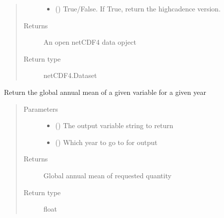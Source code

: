 \documentclass[letterpaper,10pt,english]{sphinxmanual}
\begin{document}
\begin{fulllineitems}
\begin{fulllineitems}
\begin{quote}
\begin{description}
\begin{itemize}
\item {} 
 (\sphinxstyleliteralemphasis{\sphinxupquote{, }}) \textendash{} True/False. If True, return the high\sphinxhyphen{}cadence version.

\end{itemize}

\item[{Returns}] \leavevmode
An open netCDF4 data opject

\item[{Return type}] \leavevmode
netCDF4.Dataset

\end{description}\end{quote}

\end{fulllineitems}


\begin{fulllineitems}
\label{\detokenize{source/exoplasim:exoplasim.Model.getbalance}}
Return the global annual mean of a given variable for a given year
\begin{quote}\begin{description}
\item[{Parameters}] \leavevmode\begin{itemize}
\item {} 
 () \textendash{} The output variable string to return

\item {} 
 (\sphinxstyleliteralemphasis{\sphinxupquote{, }}) \textendash{} Which year to go to for output

\end{itemize}

\item[{Returns}] \leavevmode
Global annual mean of requested quantity

\item[{Return type}] \leavevmode
float


\end{description}
\end{quote}
\end{fulllineitems}
\end{fulllineitems}
\end{document}
